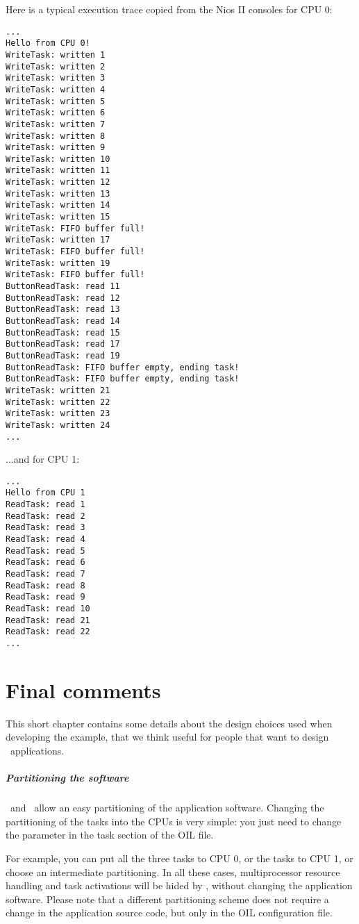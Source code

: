 Here is a typical execution trace copied from the Nios II consoles for
CPU 0:

\begin{lstlisting}
...
Hello from CPU 0!
WriteTask: written 1
WriteTask: written 2
WriteTask: written 3
WriteTask: written 4
WriteTask: written 5
WriteTask: written 6
WriteTask: written 7
WriteTask: written 8
WriteTask: written 9
WriteTask: written 10
WriteTask: written 11
WriteTask: written 12
WriteTask: written 13
WriteTask: written 14
WriteTask: written 15
WriteTask: FIFO buffer full!
WriteTask: written 17
WriteTask: FIFO buffer full!
WriteTask: written 19
WriteTask: FIFO buffer full!
ButtonReadTask: read 11
ButtonReadTask: read 12
ButtonReadTask: read 13
ButtonReadTask: read 14
ButtonReadTask: read 15
ButtonReadTask: read 17
ButtonReadTask: read 19
ButtonReadTask: FIFO buffer empty, ending task!
ButtonReadTask: FIFO buffer empty, ending task!
WriteTask: written 21
WriteTask: written 22
WriteTask: written 23
WriteTask: written 24
...
\end{lstlisting}

...and for CPU 1:

\begin{lstlisting}
...
Hello from CPU 1
ReadTask: read 1
ReadTask: read 2
ReadTask: read 3
ReadTask: read 4
ReadTask: read 5
ReadTask: read 6
ReadTask: read 7
ReadTask: read 8
ReadTask: read 9
ReadTask: read 10
ReadTask: read 21
ReadTask: read 22
...
\end{lstlisting}


\chapter{Final comments}

This short chapter contains some details about the design choices used
when developing the example, that we think useful for people that want
to design \ee\ applications.

\paragraph{Partitioning the software}

\rtd\ and \ee\ allow an easy partitioning of the application
software. Changing the partitioning of the tasks into the CPUs is very
simple: you just need to change the  parameter in the
task section of the OIL file.

For example, you can put all the three tasks to CPU 0, or the tasks to
CPU 1, or choose an intermediate partitioning. In all these cases,
multiprocessor resource handling and task activations will be hided by
\ee, without changing the application software.  Please note that a
different partitioning scheme does not require a change in the
application source code, but only in the OIL configuration file.

